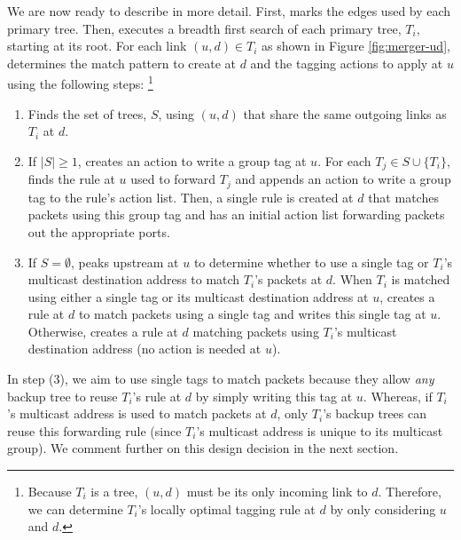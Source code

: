 We are now ready to describe \merge in more detail.  
First, \merge marks the edges used by each primary tree.  Then, \merge executes a breadth first search of each primary tree, $T_i$, starting at its root.  
For each link $(u,d) \in T_i$ as shown in Figure \ref{fig:merger-ud}, \merge determines the match pattern to create at $d$ and the tagging actions to apply at $u$ using the following steps:
\footnote{Because $T_i$ is a tree, $(u,d)$ must be its only incoming link to $d$.  Therefore, we can determine $T_i$'s locally optimal tagging rule at $d$ by only considering $u$ and $d$.}
\begin{enumerate}

	\item Finds the set of trees, $S$, using $(u,d)$ that share the same outgoing links as $T_i$ at $d$. 

	\item If $|S| \geq 1$, \merge creates an action to write a group tag at $u$.  For each $T_j \in S \cup \{T_i\}$, \merge finds the rule at $u$ used to forward $T_j$ and appends an action
	to write a group tag to the rule's action list.
	Then, a single rule is created at $d$ that matches packets using this group tag and has an initial action list forwarding packets out the appropriate ports.

	\item If $S = \emptyset$, \merge peaks upstream at $u$ to determine whether to use a single tag or $T_i$'s multicast destination address to match $T_i$'s packets at $d$. 
	When $T_i$ is matched using either a single tag or its multicast destination address at $u$, \merge creates a rule at $d$ to match packets using a single tag and writes this single
	tag at $u$.  Otherwise, \merge creates a rule at $d$ matching packets using $T_i$'s multicast destination address (no action is needed at $u$).  

\end{enumerate}
In step (3), we aim to use single tags to match packets because they allow \emph{any} backup tree to reuse $T_i$'s rule at $d$ by simply writing this tag at $u$.  
Whereas, if $T_i$'s multicast address is used to match packets at $d$, only $T_i$'s backup trees can reuse this forwarding rule (since $T_i$'s multicast address is unique to its multicast group).
We comment further on this design decision in the next section.

